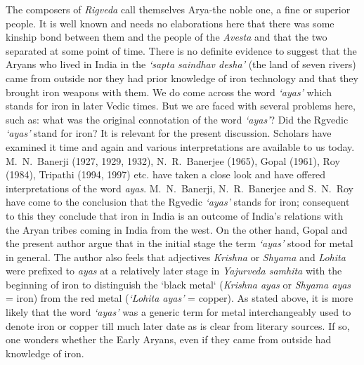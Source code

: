 \vspace{-.2cm}

The composers of \textit{Rigveda} call themselves Arya-the noble one, a fine or superior people. It is well known and needs no elaborations here that there was some kinship bond between them and the people of the \textit{Avesta} and that the two separated at some point of time. There is no definite evidence to suggest that the Aryans who lived in India in the \textit{‘sapta saindhav desha’} (the land of seven rivers) came from outside nor they had prior knowledge of iron technology and that they brought iron weapons with them. We do come across the word \textit{‘ayas’} which stands for iron in later Vedic times. But we are faced with several problems here, such as: what was the original connotation of the word \textit{‘ayas’}? Did the Rgvedic \textit{‘ayas’} stand for iron? It is relevant for the present discussion. Scholars have examined it time and again and various interpretations are available to us today. M.~N.~Banerji (1927, 1929, 1932), N.~R.~Banerjee (1965), Gopal (1961), Roy (1984), Tripathi (1994, 1997) etc. have taken a close look and have offered interpretations of the word \textit{ayas}. M.~N.~Banerji, N.~R.~Banerjee and S.~N.~Roy have come to the conclusion that the Rgvedic \textit{‘ayas’} stands for iron; consequent to this they conclude that iron in India is an outcome of India’s relations with the Aryan tribes coming in India from the west. On the other hand, Gopal and the present author argue that in the initial stage the term \textit{‘ayas’} stood for metal in general. The author also feels that adjectives \textit{Krishna}  or \textit{Shyama} and \textit{Lohita} were prefixed to \textit{ayas} at a relatively later stage in \textit{Yajurveda samhita} with the beginning of iron to distinguish the `black metal` (\textit{Krishna ayas} or \textit{Shyama ayas} = iron) from the red metal (\textit{‘Lohita ayas'} = copper). As stated above, it is more likely that the word \textit{‘ayas’} was a generic term for metal interchangeably used to denote iron or copper till much later date as is clear from literary sources. If so, one wonders whether the Early Aryans, even if they came from outside had knowledge of iron.

